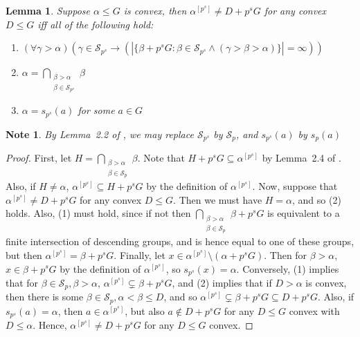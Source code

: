 \documentclass[a4paper,11pt]{article}
\newtheorem{lemma}[theorem]{Lemma}
\newtheorem*{note}{Note}
\newcommand{\nl}{\newline}
\begin{document}
\begin{lemma}\label{nonconvex conditions}
	Suppose $\alpha\leq G$ is convex, then $\alpha^{[p^s]}\neq D+p^sG$ for any convex $D\leq G$ iff all of the following hold:
	\begin{enumerate}[(1)]
		\item $(\forall \gamma > \alpha)(\gamma\in \mathcal{S}_{p^s} \rightarrow (|\{\beta+p^sG :\beta\in\mathcal{S}_{p^s}\wedge (\gamma>\beta>\alpha)\}| =\infty))$
		\item $\alpha = \bigcap\limits_{\substack{\beta> \alpha \\ \beta \in \mathcal{S}_{p^s}}}\beta$
		\item $\alpha = s_{p^s}(a)$ for some $a\in G$
	\end{enumerate}
	
\end{lemma}
\begin{note}
	By Lemma~2.2 of \cite{QE}, we may replace $\mathcal{S}_{p^s}$ by $\mathcal{S}_p$, and $s_{p^s}(a)$ by $s_p(a)$
\end{note}
\begin{proof}
	First, let $H = \bigcap\limits_{\substack{\beta> \alpha \\ \beta \in \mathcal{S}_p}}\beta$. Note that $H+p^sG\subseteq \alpha^{[p^s]}$ by Lemma~2.4 of \cite{QE}. Also, if $H \neq \alpha$, $\alpha^{[p^s]}\subseteq H+p^sG $ by the definition of $\alpha^{[p^s]}$.
	\nl\nl
	Now, suppose that $\alpha^{[p^s]}\neq D+p^sG$ for any convex $D\leq G$. Then we must have $H = \alpha$, and so (2) holds. Also, (1) must hold, since if not then $\bigcap\limits_{\substack{\beta > \alpha\\\beta\in \mathcal{S}_p}}\beta+p^sG$ is equivalent to a finite intersection of descending groups, and is hence equal to one of these groups, but then $\alpha^{[p^s]} = \beta + p^sG$. Finally, let $x\in \alpha^{[p^s]}\setminus (\alpha+p^sG)$. Then for $\beta > \alpha$, $x\in \beta +p^sG$ by the definition of $\alpha^{[p^s]}$, so $s_{p^s}(x) = \alpha$.
	\nl\nl
	Conversely, (1) implies that for $\beta \in \mathcal{S}_p,\beta > \alpha$, $\alpha^{[p^s]}\subsetneq \beta+p^sG$, and (2) implies that if $D > \alpha$ is convex, then there is some $\beta\in \mathcal{S}_p, \alpha < \beta \leq D$, and so $\alpha^{[p^s]}\subsetneq\beta+p^sG\subseteq D+p^sG$. Also, if $s_{p^s}(a) = \alpha$, then $a\in \alpha^{[p^s]}$, but also $a\notin D+p^sG$ for any $D\leq G$ convex with $D\leq \alpha$. Hence, $\alpha^{[p^s]}\neq D+p^sG$ for any $D\leq G$ convex.
\end{proof}
\end{document}
